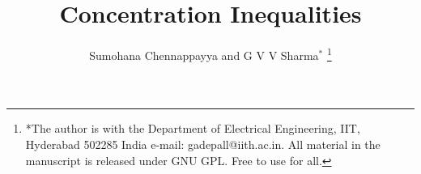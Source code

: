 \documentclass[journal,12pt,twocolumn]{IEEEtran}
\begin{document}
\let\StandardTheFigure\thefigure
\let\vec\mathbf
\renewcommand{\thefigure}{\theproblem}



\def\putbox#1#2#3{\makebox[0in][l]{\makebox[#1][l]{}\raisebox{\baselineskip}[0in][0in]{\raisebox{#2}[0in][0in]{#3}}}}
     \def\rightbox#1{\makebox[0in][r]{#1}}
     \def\centbox#1{\makebox[0in]{#1}}
     \def\topbox#1{\raisebox{-\baselineskip}[0in][0in]{#1}}
     \def\midbox#1{\raisebox{-0.5\baselineskip}[0in][0in]{#1}}

\vspace{3cm}

\title{ 
Concentration Inequalities
}


%
%
%

\author{Sumohana Chennappayya and G V V Sharma$^{*}$ %
\thanks{ *The author is with the Department
of Electrical Engineering, IIT, Hyderabad
502285 India e-mail: gadepall@iith.ac.in. All material in the manuscript is 
released under GNU GPL.  Free to use for all.}%
}
% 
%
\end{document}
